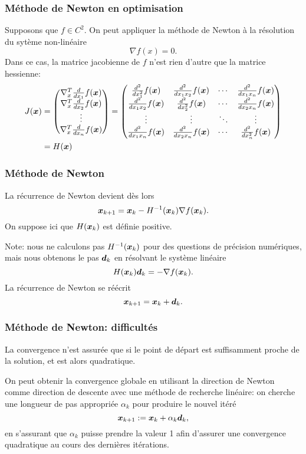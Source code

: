 \documentclass[usepdftitle=false, aspectratio=169]{beamer}
\begin{document}
\begin{frame}
	\frametitle{Méthode de Newton en optimisation}

Supposons que $f \in C^2$.
On peut appliquer la méthode de Newton à la résolution du sytème non-linéaire
$$
\nabla f(x) = 0.
$$
Dans ce cas, la matrice jacobienne de $f$ n'est rien d'autre que la matrice hessienne:
\begin{align*}
J({\boldsymbol{x}}) &=
\begin{pmatrix}
	\nabla^T_x \frac{d}{dx_1} f({\boldsymbol{x}}) \\
	\nabla^T_x \frac{d}{dx_2} f({\boldsymbol{x}}) \\
	\vdots \\
	\nabla^T_x \frac{d}{dx_n} f({\boldsymbol{x}})
\end{pmatrix}
=
\begin{pmatrix}
	\frac{d^2}{dx_1^2} f({\boldsymbol{x}}) & \frac{d^2}{dx_1x_2} f({\boldsymbol{x}}) & \cdots & \frac{d^2}{dx_1x_n} f({\boldsymbol{x}}) \\
	\frac{d^2}{dx_1x_2} f({\boldsymbol{x}}) & \frac{d^2}{dx_2^2} f({\boldsymbol{x}}) & \cdots & \frac{d^2}{dx_2x_n} f({\boldsymbol{x}}) \\
	\vdots & \vdots & \ddots & \vdots \\
	\frac{d^2}{dx_1x_n} f({\boldsymbol{x}}) & \frac{d^2}{dx_2x_n} f({\boldsymbol{x}}) & \cdots & \frac{d^2}{dx_n^2} f({\boldsymbol{x}})
\end{pmatrix} \\
&= H({\boldsymbol{x}})
\end{align*}
	
\end{frame}

\begin{frame}
\frametitle{Méthode de Newton}

La récurrence de Newton devient dès lors
$$
{\boldsymbol{x}}_{k+1} = {\boldsymbol{x}}_k - H^{-1}({\boldsymbol{x}}_k) \nabla f({\boldsymbol{x}}_k).
$$
On suppose ici que $H({\boldsymbol{x}}_k)$ est définie positive.

\mbox{}

Note: nous ne calculons pas $H^{-1}({\boldsymbol{x}}_k)$ pour des questions de précision numériques, mais nous obtenons le pas ${\boldsymbol{d}}_k$ en résolvant le système linéaire
$$
H({\boldsymbol{x}}_k) {\boldsymbol{d}}_k = -\nabla f({\boldsymbol{x}}_k).
$$
La récurrence de Newton se réécrit
$$
{\boldsymbol{x}}_{k+1} = {\boldsymbol{x}}_k + {\boldsymbol{d}}_k.
$$

\end{frame}

\begin{frame}
\frametitle{Méthode de Newton: difficultés}

La convergence n'est assurée que si le point de départ est suffisamment proche de la solution, et est alors quadratique.

\mbox{}

On peut obtenir la convergence globale en utilisant la direction de Newton comme direction de descente avec une méthode de recherche linéaire: on cherche une longueur de pas appropriée $\alpha_k$ pour produire le nouvel itéré
$$
{\boldsymbol{x}}_{k+1} := {\boldsymbol{x}}_k+\alpha_k {\boldsymbol{d}}_k, 
$$
en s'assurant que $\alpha_k$ puisse prendre la valeur 1 afin d'assurer une convergence quadratique au cours des dernières itérations.

\end{frame}
\end{document}
